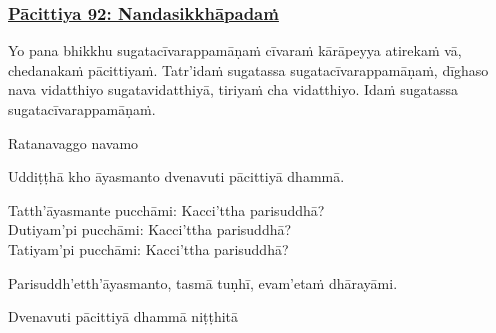 \subsubsection*{\hyperref[exp92]{Pācittiya 92: Nandasikkhāpadaṁ}}
\label{pac92}
Yo pana bhikkhu sugatacīvarappamāṇaṁ cīvaraṁ kārāpeyya atirekaṁ vā, chedanakaṁ pācittiyaṁ. Tatr'idaṁ sugatassa sugatacīvarappamāṇaṁ, dīghaso nava vidatthiyo sugatavidatthiyā, tiriyaṁ cha vidatthiyo. Idaṁ sugatassa sugatacīvarappamāṇaṁ.

\begin{center}
  Ratanavaggo navamo
\end{center}

\medskip

\begin{center}
Uddiṭṭhā kho āyasmanto dvenavuti pācittiyā dhammā.

\smallskip

Tatth'āyasmante pucchāmi: Kacci'ttha parisuddhā?\\
Dutiyam'pi pucchāmi: Kacci'ttha parisuddhā?\\
Tatiyam'pi pucchāmi: Kacci'ttha parisuddhā?

\smallskip

Parisuddh'etth'āyasmanto, tasmā tuṇhī, evam'etaṁ dhārayāmi.
\end{center}

\begin{outro}
  Dvenavuti pācittiyā dhammā niṭṭhitā
\end{outro}

\clearpage
